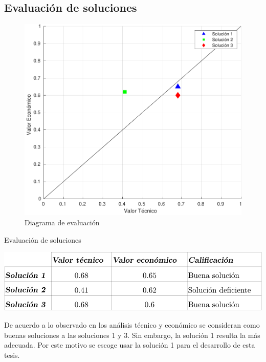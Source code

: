 \subsection{Evaluación de soluciones}
\begin{figure}[htbp!]
\centering
\includegraphics[width=\textwidth]{grafico.pdf}
\caption{Diagrama de evaluación}
\label{diag:diag_eval}
\end{figure}

\begin{table}[htbp!]
  \centering
  \caption{Evaluación de soluciones}
  \label{diag:eval_sol}
  \includegraphics[width=0.8\linewidth]{tab_puntaje.pdf}
\end{table}

De acuerdo a lo observado en los análisis técnico y económico se consideran como buenas soluciones a las soluciones 1 y 3. Sin embargo, la solución 1 resulta la más adecuada. Por este motivo se escoge usar la solución 1 para el desarrollo de esta tesis.
